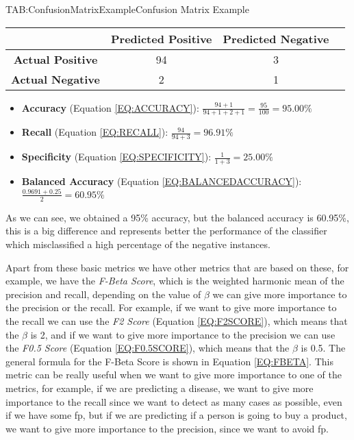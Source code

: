 \begin{table}[Confusion Matrix Example]{TAB:ConfusionMatrixExample}{Confusion Matrix Example}
    \small
    \begin{tabular}{cccc}
            \hline
            & \textbf{Predicted Positive} & \textbf{Predicted Negative} \\
            \hline \hline
            \textbf{Actual Positive} & 94 & 3 \\
            \textbf{Actual Negative} & 2 & 1 \\
            \hline
        \end{tabular}
\end{table}

\begin{itemize}
    \item \textbf{Accuracy} (Equation \ref{EQ:ACCURACY}): $\frac{94 + 1}{94+1+2+1} = \frac{95}{100} = 95.00\%$
    \item \textbf{Recall} (Equation \ref{EQ:RECALL}): $\frac{94}{94+3} = 96.91\%$
    \item \textbf{Specificity} (Equation \ref{EQ:SPECIFICITY}): $\frac{1}{1+3} = 25.00\%$
    \item \textbf{Balanced Accuracy} (Equation \ref{EQ:BALANCEDACCURACY}): $\frac{0.9691 + 0.25}{2} = 60.95\%$
\end{itemize}

As we can see, we obtained a 95\% accuracy, but the balanced accuracy is 60.95\%, this is a big difference and represents better the performance of the classifier which misclassified a high percentage of the negative instances.

Apart from these basic metrics we have other metrics that are based on these, for example, we have the \textit{F-Beta Score}, which is the weighted harmonic mean of the precision and recall, depending on the value of $\beta$ we can give more importance to the precision or the recall. For example, if we want to give more importance to the recall we can use the \textit{F2 Score} (Equation \ref{EQ:F2SCORE}), which means that the $\beta$ is 2, and if we want to give more importance to the precision we can use the \textit{F0.5 Score} (Equation \ref{EQ:F0.5SCORE}), which means that the $\beta$ is 0.5. The general formula for the F-Beta Score is shown in Equation \ref{EQ:FBETA}. This metric can be really useful when we want to give more importance to one of the metrics, for example, if we are predicting a disease, we want to give more importance to the recall since we want to detect as many cases as possible, even if we have some \ac{fp}, but if we are predicting if a person is going to buy a product, we want to give more importance to the precision, since we want to avoid \ac{fp}.

